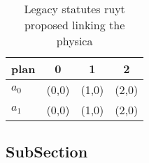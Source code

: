 \documentclass[a4paper]{article}
\begin{document}
\begin{table}
\begin{adjustbox}{width=0.6\columnwidth}
\begin{tabular}{|l|l|l|l|}
\hline
\textbf{plan} & \multicolumn{1}{c|}{\textbf{0}} & \multicolumn{1}{c|}{\textbf{1}} & \multicolumn{1}{c|}{\textbf{2}} \\ \hline
\textbf{$a_0$}  & (0,0) & (1,0) & (2,0) \\ \hline
\textbf{$a_1$}  & (0,0) & (1,0) & (2,0) \\ \hline
\end{tabular}
\end{adjustbox}
\caption{Legacy statutes ruyt proposed linking the physica
}
\end{table}

\subsection{SubSection}
\end{document}
